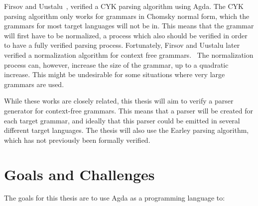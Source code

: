 \documentclass{article}
\begin{document}
	Firsov and Uustalu~\cite{Firsov14}, verified a CYK parsing algorithm using
	Agda. The CYK parsing algorithm only works for grammars in Chomsky normal
	form, which the grammars for most target languages will not be in. This
	means that the grammar will first have to be normalized, a process which
	also should be verified in order to have a fully verified parsing process.
	Fortunately, Firsov and Uustalu later verified a normalization algorithm
	for context free grammars.~\cite{Firsov15} The normalization process can,
	however, increase the size of the grammar, up to a quadratic increase. This
	might be undesirable for some situations where very large grammars are
	used.

	While these works are closely related, this thesis will aim to verify a
	parser generator for context-free grammars. This means that a parser will
	be created for each target grammar, and ideally that this parser could be
	emitted in several different target languages. The thesis will also use the
	Earley parsing algorithm, which has not previously been formally verified.

\section{Goals and Challenges}
	

	The goals for this thesis are to use Agda as a programming language to:
	
\end{document}
